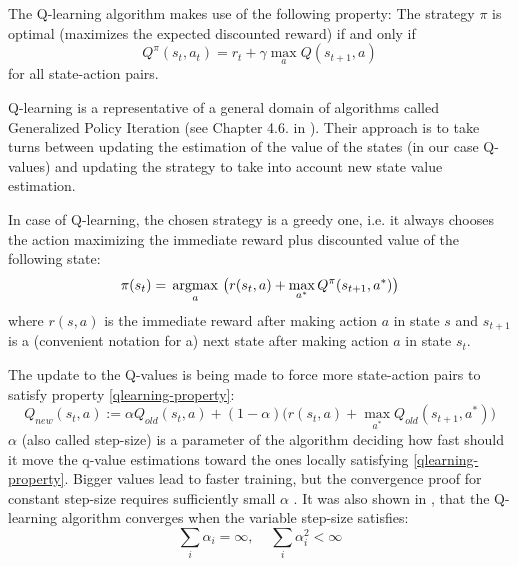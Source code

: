 The Q-learning algorithm makes use of the following property:
The strategy $\pi$ is optimal (maximizes the expected discounted reward) if and only if
\begin{equation}\label{qlearning-property}
  Q^\pi(s_t, a_t) = r_t + \gamma \max_a Q(s_{t+1}, a)
\end{equation}
for all state-action pairs.

Q-learning is a representative of a general domain of algorithms called Generalized Policy Iteration (see Chapter 4.6. in \cite{reinforcement-book}). Their approach is to take turns between updating the estimation of the value of the states (in our case Q-values) and updating the strategy to take into account new state value estimation.
 
In case of Q-learning, the chosen strategy is a greedy one, i.e. it always chooses the action maximizing the immediate reward plus discounted value of the following state:
\begin{equation}
  \pi(s_t) = \operatorname*{\,\operatorname{argmax}\,}_a \big(r(s_t, a) + \max_{a^*} Q^\pi(s_{t+1}, a^*)\big)
\end{equation}
where $r(s, a)$ is the immediate reward after making action $a$ in state $s$ and $s_{t+1}$ is a (convenient notation for a) next state after making action $a$ in state $s_t$.

The update to the Q-values is being made to force more state-action pairs to satisfy property \eqref{qlearning-property}:
\begin{equation}
  Q_{new}(s_t, a) := \alpha Q_{old}(s_t, a) + (1 - \alpha)\big(r(s_t, a) + \max_{a^*} Q_{old}(s_{t+1}, a^*)\big)
\end{equation}
$\alpha$ (also called step-size) is a parameter of the algorithm deciding how fast should it move the q-value estimations toward the ones locally satisfying \eqref{qlearning-property}. Bigger values lead to faster training, but the convergence proof for constant step-size requires sufficiently small $\alpha$ \cite[section~3.]{qlearning-old}. It was also shown in \cite{qlearning-convergence}, that the Q-learning algorithm converges when the variable step-size satisfies:
\begin{equation}
  \sum_i \alpha_i = \infty, \;\;\;\; \sum_i \alpha_i^2 < \infty
\end{equation}

